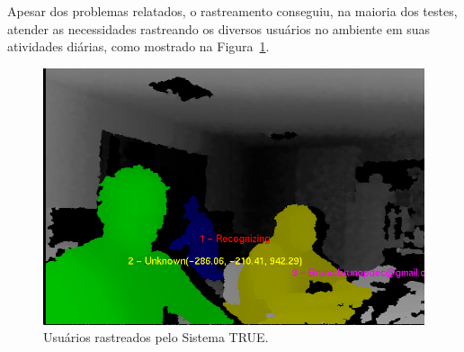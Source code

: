 	Apesar dos problemas relatados, o rastreamento conseguiu, na maioria dos testes, atender as necessidades rastreando os diversos usuários no ambiente em suas atividades diárias, como mostrado na Figura~\ref{fig:varios-usuarios-ambiente}.

	\begin{figure}[htb]
			\begin{center}
				\includegraphics[scale=0.5]{figuras/5.Testes/oclusao/usuarios-rastreados.png}
			\end{center}
			\caption{Usuários rastreados pelo Sistema TRUE.}
			\label{fig:varios-usuarios-ambiente}
		\end{figure}
		
	